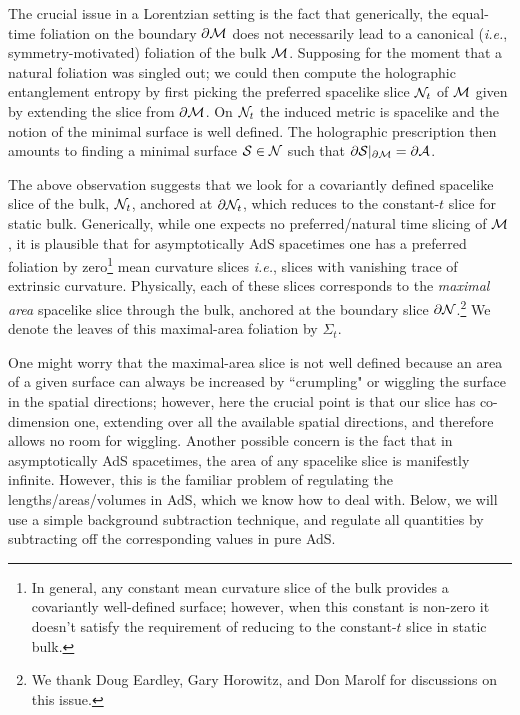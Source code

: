 \documentclass[12pt]{article}
\def\ie{{\it i.e.}}
\def\p{\partial}
\def\CA{{\cal A}}
\def\CN{{\cal N}}
\def\CS{{\cal S}}
\def\CSig{{\Sigma}}
\def\p{\partial}
\def\p{\partial}
\def\bulk{{\cal M}}
\def\bdy{\p{\cal M}}
\def\bdys{\p{\cal N}}
\def\ms{\CS}
\def\Sms{\CSig}
\def\brA{\p \CA}
\begin{document}
 The crucial issue in a Lorentzian setting is the fact that generically,  the equal-time foliation on the  boundary $\bdy$ does not necessarily lead to a canonical (\ie, symmetry-motivated) foliation of the bulk $\bulk$.  Supposing for the moment that a natural foliation was singled out; we could then compute the holographic entanglement entropy by first picking the
preferred spacelike slice $\CN_t$ of $\bulk$ given by extending the slice from $\bdy$.
On $\CN_t$ the induced metric is spacelike and  the notion of the minimal surface is well defined. The holographic prescription then amounts to finding a minimal surface $\ms \in \CN$ such that  $\p \ms |_{\bdy}= \brA$.


The above observation suggests that we look for a covariantly
defined spacelike slice of the bulk, $\CN_t$, anchored at $\bdys_t$,
which reduces to the constant-$t$ slice for static bulk.
Generically, while one expects no preferred/natural time slicing of
$\bulk$, it is plausible that for asymptotically AdS spacetimes one
has a preferred foliation by zero\footnote{ In general, any constant
mean curvature slice of the bulk provides a covariantly well-defined
surface; however, when this constant is non-zero it doesn't satisfy
the requirement of reducing to the constant-$t$ slice in static
bulk. } mean curvature slices \ie, slices with vanishing trace of
extrinsic curvature. Physically, each of these slices corresponds to the
{\it maximal area} spacelike slice through the bulk, anchored at the
boundary slice $\bdys$.\footnote{We thank Doug Eardley, Gary
Horowitz, and Don Marolf for discussions on this issue.} We denote
the leaves of this maximal-area foliation by $\Sms_t$.

One might worry that the maximal-area slice is not well defined because an area of a given surface can always be increased by ``crumpling" or wiggling the surface in the spatial directions; however, here the crucial point is that our slice has co-dimension one, extending over all the available spatial directions, and therefore allows no room for wiggling.  Another possible concern is the fact that in asymptotically AdS spacetimes, the area of any spacelike slice is manifestly infinite.  However, this is the familiar problem of regulating the lengths/areas/volumes in AdS, which we know how to deal with.  Below, we will use a simple background subtraction technique, and regulate all quantities by subtracting off the corresponding values in pure AdS.
\end{document}
